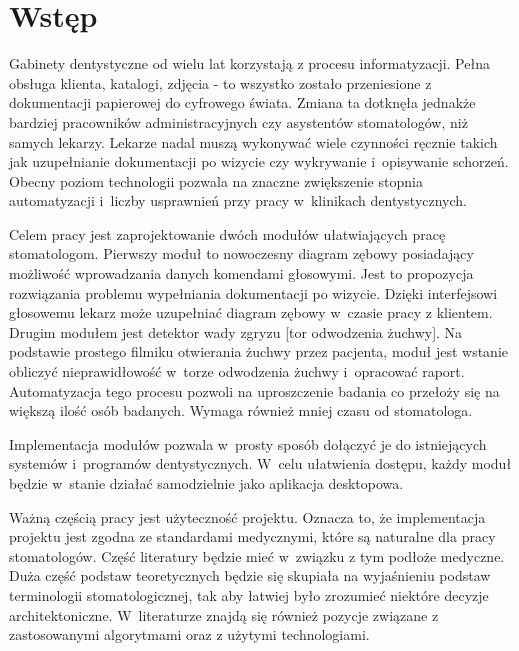
\chapter{Wstęp}


Gabinety dentystyczne od wielu lat korzystają z procesu informatyzacji. Pełna obsługa klienta, katalogi, zdjęcia - to wszystko zostało przeniesione z dokumentacji papierowej do cyfrowego świata. Zmiana ta dotknęła jednakże bardziej pracowników administracyjnych czy asystentów stomatologów, niż samych lekarzy\cite{dentalSurvay}. Lekarze nadal muszą wykonywać wiele czynności ręcznie takich jak uzupełnianie dokumentacji po wizycie czy wykrywanie i~opisywanie schorzeń. Obecny poziom technologii pozwala na znaczne zwiększenie stopnia automatyzacji i~liczby usprawnień przy pracy w~klinikach dentystycznych.

Celem pracy jest zaprojektowanie dwóch modułów ułatwiających pracę stomatologom. Pierwszy moduł to nowoczesny diagram zębowy posiadający możliwość wprowadzania danych komendami głosowymi. Jest to propozycja rozwiązania problemu wypełniania dokumentacji po wizycie. Dzięki interfejsowi głosowemu lekarz może uzupełniać diagram zębowy w~czasie pracy z klientem. Drugim modułem jest detektor wady zgryzu [tor odwodzenia żuchwy]. Na podstawie prostego filmiku otwierania żuchwy przez pacjenta, moduł jest wstanie obliczyć nieprawidłowość w~torze odwodzenia żuchwy i~opracować raport. Automatyzacja tego procesu pozwoli na uproszczenie badania co przełoży się na większą ilość osób badanych. Wymaga również mniej czasu od stomatologa.

Implementacja modułów pozwala w~prosty sposób dołączyć je do istniejących systemów i~programów dentystycznych. W~celu ułatwienia dostępu, każdy moduł będzie w~stanie działać samodzielnie jako aplikacja desktopowa. 

Ważną częścią pracy jest użyteczność projektu. Oznacza to, że implementacja projektu jest zgodna ze standardami medycznymi, które są naturalne dla pracy stomatologów. Część literatury będzie mieć w~związku z tym podłoże medyczne. Duża część podstaw teoretycznych będzie się skupiała na wyjaśnieniu podstaw terminologii stomatologicznej, tak aby łatwiej było zrozumieć niektóre decyzje architektoniczne. W~literaturze znajdą się również pozycje związane z zastosowanymi algorytmami oraz z użytymi technologiami.

